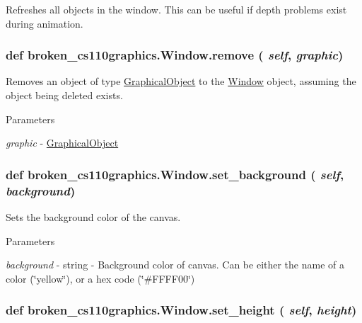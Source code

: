 Refreshes all objects in the window. This can be useful if depth problems exist during animation. \hypertarget{classbroken__cs110graphics_1_1Window_a8ffc7e3db2161bec17e0d56e9742c3c2}{
\subsubsection[{remove}]{\setlength{\rightskip}{0pt plus 5cm}def broken\_\-cs110graphics.Window.remove ( {\em self}, \/   {\em graphic})}}
\label{classbroken__cs110graphics_1_1Window_a8ffc7e3db2161bec17e0d56e9742c3c2}


Removes an object of type \hyperlink{classbroken__cs110graphics_1_1GraphicalObject}{GraphicalObject} to the \hyperlink{classbroken__cs110graphics_1_1Window}{Window} object, assuming the object being deleted exists. 
\begin{DoxyParams}{Parameters}
\item[{\em graphic}]-\/ \hyperlink{classbroken__cs110graphics_1_1GraphicalObject}{GraphicalObject} \end{DoxyParams}
\hypertarget{classbroken__cs110graphics_1_1Window_ad2d9d73c97fe3eac5c1974bf4a81793a}{
\subsubsection[{set\_\-background}]{\setlength{\rightskip}{0pt plus 5cm}def broken\_\-cs110graphics.Window.set\_\-background ( {\em self}, \/   {\em background})}}
\label{classbroken__cs110graphics_1_1Window_ad2d9d73c97fe3eac5c1974bf4a81793a}


Sets the background color of the canvas. 
\begin{DoxyParams}{Parameters}
\item[{\em background}]-\/ string -\/ Background color of canvas. Can be either the name of a color (\char`\"{}yellow\char`\"{}), or a hex code (\char`\"{}\#FFFF00\char`\"{}) \end{DoxyParams}
\hypertarget{classbroken__cs110graphics_1_1Window_a3eeafaf1782c5d9ab3643b06bb0fbb54}{
\subsubsection[{set\_\-height}]{\setlength{\rightskip}{0pt plus 5cm}def broken\_\-cs110graphics.Window.set\_\-height ( {\em self}, \/   {\em height})}}
\label{classbroken__cs110graphics_1_1Window_a3eeafaf1782c5d9ab3643b06bb0fbb54}


